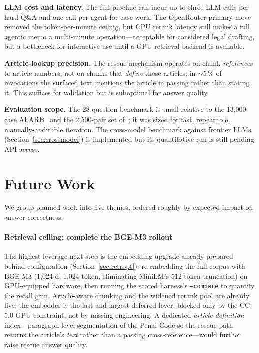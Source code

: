 \documentclass[final,1p,times]{elsarticle}
\begin{document}
\textbf{LLM cost and latency.} The full pipeline can incur up to three LLM calls
per hard Q\&A and one call per agent for case work. The OpenRouter-primary move
removed the token-per-minute ceiling, but CPU rerank latency still makes a full
agentic memo a multi-minute operation---acceptable for considered legal drafting,
but a bottleneck for interactive use until a GPU retrieval backend is available.

\textbf{Article-lookup precision.} The rescue mechanism operates on chunk
\emph{references} to article numbers, not on chunks that \emph{define} those
articles; in $\sim$5\,\% of invocations the surfaced text mentions the article in
passing rather than stating it. This suffices for validation but is suboptimal for
answer quality.

\textbf{Evaluation scope.} The 28-question benchmark is small relative to the
13{,}000-case ALARB~\cite{alarb2025} and the 2{,}500-pair set
of~\cite{hrimech2025}; it was sized for fast, repeatable, manually-auditable
iteration. The cross-model benchmark against frontier LLMs
(Section~\ref{sec:crossmodel}) is implemented but its quantitative run is still
pending API access.

\section{Future Work}\label{sec:future}

We group planned work into five themes, ordered roughly by expected impact on
answer correctness.

\paragraph{Retrieval ceiling: complete the BGE-M3 rollout} The highest-leverage
next step is the embedding upgrade already prepared behind configuration
(Section~\ref{sec:retropt}): re-embedding the full corpus with BGE-M3 (1{,}024-d,
1{,}024-token, eliminating MiniLM's 512-token truncation) on GPU-equipped
hardware, then running the scored harness's \texttt{--compare} to quantify the
recall gain. Article-aware chunking and the widened rerank pool are already live;
the embedder is the last and largest deferred lever, blocked only by the CC-5.0
GPU constraint, not by missing engineering. A dedicated \emph{article-definition}
index---paragraph-level segmentation of the Penal Code so the rescue path returns
the article's \emph{text} rather than a passing cross-reference---would further
raise rescue answer quality.
\end{document}
